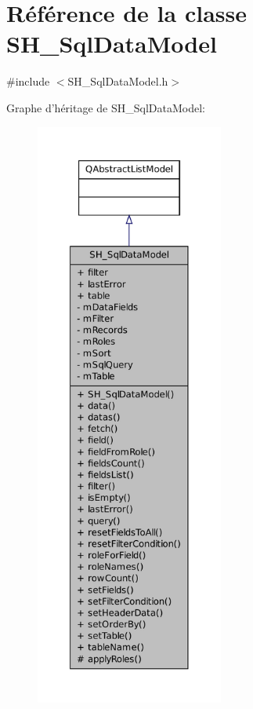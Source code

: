 \hypertarget{classSH__SqlDataModel}{\section{Référence de la classe S\-H\-\_\-\-Sql\-Data\-Model}
\label{classSH__SqlDataModel}
}


{\ttfamily \#include $<$S\-H\-\_\-\-Sql\-Data\-Model.\-h$>$}



Graphe d'héritage de S\-H\-\_\-\-Sql\-Data\-Model\-:\nopagebreak
\begin{figure}[H]
\begin{center}
\leavevmode
\includegraphics[height=550pt]{classSH__SqlDataModel__inherit__graph}
\end{center}
\end{figure}


